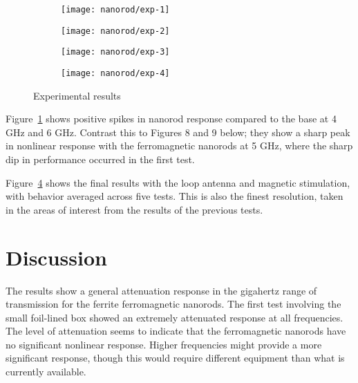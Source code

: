 \begin{figure}[h!]
    \centering
    \begin{subfigure}{0.45\textwidth}
        \centering
        \texttt{[image: nanorod/exp-1]}
        \caption[]{}
        \label{fig:nanorod-exp-1}
    \end{subfigure}
        \begin{subfigure}{0.45\textwidth}
        \centering
        \texttt{[image: nanorod/exp-2]}
        \caption[]{}
        \label{fig:nanorod-exp-2}
    \end{subfigure}
        \begin{subfigure}{0.45\textwidth}
        \centering
        \texttt{[image: nanorod/exp-3]}
        \caption[]{}
        \label{fig:nanorod-exp-3}
    \end{subfigure}
        \begin{subfigure}{0.45\textwidth}
        \centering
        \texttt{[image: nanorod/exp-4]}
        \caption[]{}
        \label{fig:nanorod-exp-4}
    \end{subfigure}
    \caption[Ferromagnetic nanorod experimental results]{Experimental results}
    \label{fig:nanorod-results}
\end{figure}

Figure~\ref{fig:nanorod-exp-1} shows positive spikes in nanorod response compared to the base at 4 GHz and 6 GHz. Contrast this to Figures 8 and 9 below; they show a sharp peak in nonlinear response with the ferromagnetic nanorods at 5 GHz, where the sharp dip in performance occurred in the first test.

Figure~\ref{fig:nanorod-exp-4} shows the final results with the loop antenna and magnetic stimulation, with behavior averaged across five tests. This is also the finest resolution, taken in the areas of interest from the results of the previous tests.

\section{Discussion}
\label{sec:nanorod-discussion}

The results show a general attenuation response in the gigahertz range of transmission for the ferrite ferromagnetic nanorods. The first test involving the small foil-lined box showed an extremely attenuated response at all frequencies. The level of attenuation seems to indicate that the ferromagnetic nanorods have no significant nonlinear response. Higher frequencies might provide a more significant response, though this would require different equipment than what is currently available.
